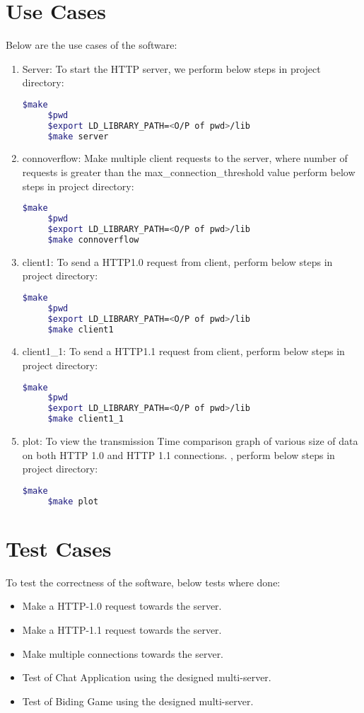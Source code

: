 \documentclass[a4paper]{article}
\begin{document}
\section{Use Cases}
Below are the use cases of the software:
\begin{enumerate}
    \item Server: To start the HTTP server, we perform below steps in project directory:
    \begin{lstlisting}[language=bash]
     $make 
     $pwd
     $export LD_LIBRARY_PATH=<O/P of pwd>/lib
     $make server
    \end{lstlisting}
    \item connoverflow: Make multiple client requests to the server, where number of requests is greater than the max\_connection\_threshold value perform below steps in project directory:
    \begin{lstlisting}[language=bash]
     $make 
     $pwd
     $export LD_LIBRARY_PATH=<O/P of pwd>/lib
     $make connoverflow
    \end{lstlisting}
    \item client1: To send a HTTP1.0 request from client, perform below steps in project directory:
    \begin{lstlisting}[language=bash]
     $make 
     $pwd
     $export LD_LIBRARY_PATH=<O/P of pwd>/lib
     $make client1
    \end{lstlisting}
    \item client1\_1: To send a HTTP1.1 request from client, perform below steps in project directory:
    \begin{lstlisting}[language=bash]
     $make 
     $pwd
     $export LD_LIBRARY_PATH=<O/P of pwd>/lib
     $make client1_1
    \end{lstlisting}
    \item plot: To view the transmission Time comparison graph of various size of data on both HTTP 1.0 and HTTP 1.1 connections. , perform below steps in project directory:
    \begin{lstlisting}[language=bash]
     $make 
     $make plot
    \end{lstlisting}
\end{enumerate}
\section{Test Cases}
To test the correctness of the software, below tests where done:
 \begin{itemize}
     \item Make a HTTP-1.0 request towards the server.
     \item Make a HTTP-1.1 request towards the server.
     \item Make multiple connections towards the server.
     \item Test of Chat Application using the designed multi-server.
     \item Test of Biding Game using the designed multi-server.
 \end{itemize}
\end{document}
